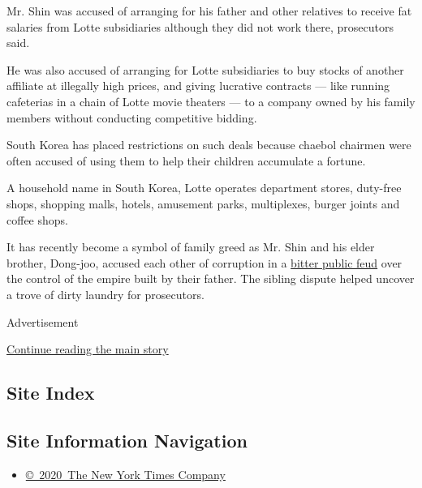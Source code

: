 Mr. Shin was accused of arranging for his father and other relatives to
receive fat salaries from Lotte subsidiaries although they did not work
there, prosecutors said.

He was also accused of arranging for Lotte subsidiaries to buy stocks of
another affiliate at illegally high prices, and giving lucrative
contracts --- like running cafeterias in a chain of Lotte movie theaters
--- to a company owned by his family members without conducting
competitive bidding.

South Korea has placed restrictions on such deals because chaebol
chairmen were often accused of using them to help their children
accumulate a fortune.

A household name in South Korea, Lotte operates department stores,
duty-free shops, shopping malls, hotels, amusement parks, multiplexes,
burger joints and coffee shops.

It has recently become a symbol of family greed as Mr. Shin and his
elder brother, Dong-joo, accused each other of corruption in a
\href{http://www.nytimes.com/2015/09/23/business/international/south-korean-chaebol-drama-lotte.html}{bitter
public feud} over the control of the empire built by their father. The
sibling dispute helped uncover a trove of dirty laundry for prosecutors.

Advertisement

\protect\hyperlink{after-bottom}{Continue reading the main story}

\hypertarget{site-index}{%
\subsection{Site Index}\label{site-index}}

\hypertarget{site-information-navigation}{%
\subsection{Site Information
Navigation}\label{site-information-navigation}}

\begin{itemize}
\tightlist
\item
  \href{https://help.nytimes.com/hc/en-us/articles/115014792127-Copyright-notice}{©~2020~The
  New York Times Company}
\end{itemize}

